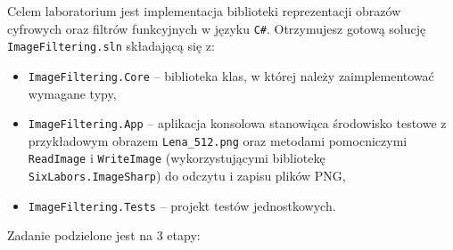 \documentclass[11pt,a4paper,addpoints]{exam}
\begin{document}
\sloppy

\cellwidth{2.5cm}
\noindent \gradetable[h]

\vspace{0.4cm}

Celem laboratorium jest implementacja biblioteki reprezentacji obrazów cyfrowych oraz filtrów funkcyjnych w języku \texttt{C\#}.
Otrzymujesz gotową solucję \texttt{ImageFiltering.sln} składającą się z:
\begin{itemize}
    \item \texttt{ImageFiltering.Core} -- biblioteka klas, w której należy zaimplementować wymagane typy,
    \item \texttt{ImageFiltering.App} -- aplikacja konsolowa stanowiąca środowisko testowe z przykładowym obrazem \texttt{Lena\_512.png} oraz metodami pomocniczymi \texttt{ReadImage} i \texttt{WriteImage} (wykorzystującymi bibliotekę \texttt{SixLabors.ImageSharp}) do odczytu i zapisu plików PNG,
    \item \texttt{ImageFiltering.Tests} -- projekt testów jednostkowych.
\end{itemize}

Zadanie podzielone jest na 3 etapy:
\end{document}

